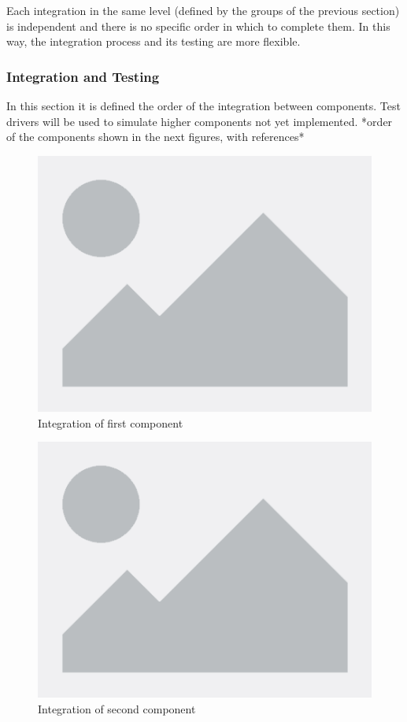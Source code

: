 \documentclass[table, 12pt]{article}
\begin{document}
Each integration in the same level (defined by the groups of the previous
section) is independent and there is no specific order in which to complete them.
In this way, the integration process and its testing are more flexible.

\subsubsection{Integration and Testing}
In this section it is defined the order of the integration between components. Test drivers will be used to simulate higher components not yet implemented.
*order of the components shown in the next figures, with references*

\begin{figure}[H]
    \includegraphics[scale=0.6, center]{assets/placeholder.png}
    \caption{Integration of first component}
    \label{fig: integration_DataManager}
\end{figure}

\begin{figure}[H]
    \centering
    \includegraphics[scale=0.6]{assets/placeholder.png} 
    \caption{Integration of second component}%
    \label{fig: integration_MapServiceManager_WeatherManager}%
\end{figure}
\end{document}
